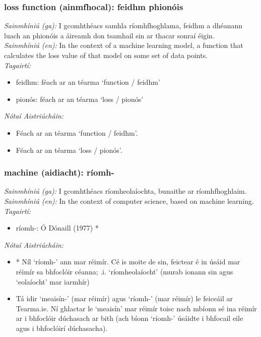 \subsubsection*{loss function (ainmfhocal): feidhm phionóis}
 \noindent \textit{Sainmhíniú (ga):} I gcomhthéacs samhla ríomhfhoghlama, feidhm a dhéanann luach an phionóis a áireamh don tsamhail sin ar thacar sonraí éigin.
\\
 \noindent \textit{Sainmhíniú (en):} In the context of a machine learning model, a function that calculates the loss value of that model on some set of data points.
\\
 \noindent \textit{Tagairtí:}
\begin{itemize}
	\item feidhm: féach ar an téarma `function / feidhm'
	\item pionós: féach ar an téarma `loss / pionós'
\end{itemize}

 \noindent \textit{Nótaí Aistriúcháin:}
\begin{itemize}
	\item Féach ar an téarma `function / feidhm'.
	\item Féach ar an téarma `loss / pionós'.
\end{itemize}


\subsubsection*{machine (aidiacht): ríomh-}
 \noindent \textit{Sainmhíniú (ga):} I gcomhthéacs ríomheolaíochta, bunaithe ar ríomhfhoghlaim.
\\
 \noindent \textit{Sainmhíniú (en):} In the context of computer science, based on machine learning.
\\
 \noindent \textit{Tagairtí:}
\begin{itemize}
	\item ríomh-: Ó Dónaill (1977) \cite{odonaill}*
\end{itemize}

 \noindent \textit{Nótaí Aistriúcháin:}
\begin{itemize}
	\item * Níl `ríomh-' ann mar réimír. Cé is moite de sin, feictear é in úsáid mar réimír sa bhfoclóir céanna; .i. `ríomheolaíocht' (murab ionann sin agus `eolaíocht' mar iarmhír)
	\item Tá idir `meaisín-' (mar réimír) agus `ríomh-' (mar réimír) le feiceáil ar Tearma.ie. Ní ghlactar le `meaisín' mar réimír toisc nach mbíonn sé ina réimír ar i bhfoclóir dúchasach ar bith (ach bíonn `ríomh-' úsáidte i bhfocail eile agus i bhfoclóirí dúchasacha).
\end{itemize}


